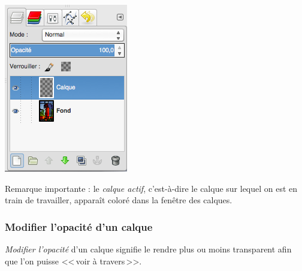 \begin{minipage}[c]{.32\textwidth}
\centering%
\includegraphics[angle=0,width=.85\textwidth]{./images/image02/GimpCalqueAjouter3}
\end{minipage}

\vspace{12pt}

Remarque importante : le \emph{calque actif}, c'est-à-dire le calque sur lequel on est en train de travailler, apparaît coloré dans la fenêtre des calques.


\subsubsection{Modifier l'opacité d'un calque}\label{Gimp2CalquesOpacite} 

\emph{Modifier l'opacité} d'un calque signifie le rendre plus ou moins transparent afin que l'on puisse <<\,voir à travers\,>>.

